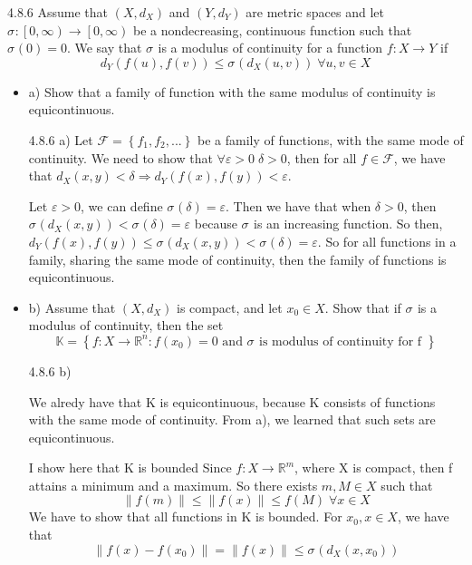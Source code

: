 \documentclass[a4paper,norsk]{article}
\renewcommand{\leq}{\leqslant}
\renewcommand{\epsilon}{\varepsilon}
\begin{document}
\begin{oppgavebox}{4.8.6}{}
Assume that $ \left( X, d_X \right)  $ and $ \left( Y, d_Y \right)  $ are metric spaces and let $ \sigma _{ } : \left[ 0, \infty \right) \to  \left[ 0, \infty \right)  $ be a nondecreasing, continuous function such that $ \sigma _{ } (0) = 0 $. We say that $ \sigma _{ }  $ is a modulus of continuity for a function $ f : X \to Y $ if
\[
    d_Y \left( f(u), f(v) \right) \leq \sigma _{ } \left( d_X \left( u, v \right)  \right) \; \forall  u, v \in X
\]
\begin{itemize}
  \item a) Show that a family of function with the same modulus of continuity is equicontinuous. 
  

  \begin{proofbox}{4.8.6 a)}{}
    Let $ \mathcal{F} = \left\{ f_1, f_2, ... \right\}  $ be a family of functions, with the same mode of continuity. We need to show that $ \forall \epsilon > 0 \; \delta > 0 $, then for all $ f \in \mathcal{F} $, we have that  $ d_X \left( x, y \right) < \delta  \Rightarrow d_Y \left( f(x), f(y) \right) < \epsilon  $. 

    Let $ \epsilon > 0 $, we can define $ \sigma _{ } ( \delta ) = \epsilon  $. Then we have that when $ \delta  > 0 $, then $ \sigma _{ } \left( d_X(x, y) \right) < \sigma _{ } \left( \delta  \right) = \epsilon    $ because $ \sigma _{ }  $ is an increasing function. So then,  $ d_Y \left( f(x), f(y) \right) \leq \sigma _{ } \left( d_X \left( x, y \right)  \right) < \sigma _{ } ( \delta ) = \epsilon    $. So for all functions in a family, sharing the same mode of continuity, then the family of functions is equicontinuous.
  \end{proofbox}


  \item b) Assume that $ \left( X, d_X \right)  $ is compact, and let $ x_0 \in X $. Show that if $ \sigma _{ }  $ is a modulus of continuity, then the set
  \[
      \mathbb{K} = \left\{ f : X \to \mathbb{R}^n : f(x_0) = 0 \text{ and  } \sigma _{ }  \text{ is modulus of continuity for f }  \right\} 
  \]

  \begin{proofbox}{4.8.6 b)}{}

    We alredy have that K is equicontinuous, because K consists of functions with the same mode of continuity. From a), we learned that such sets are equicontinuous.

    I show here that K is bounded
    Since $ f : X \to \mathbb{R}^m $, where X is compact, then f attains a minimum and a maximum. So there exists $ m, M \in X $ such that 
    \[
        \left\lVert f(m) \right\rVert \leq \left\lVert f(x) \right\rVert \leq f(M) \; \forall x \in X
    \]
    We have to show that all functions in K is bounded. For $ x_0, x \in X $, we have that 
    \[
        \left\lVert f(x) - f(x_0) \right\rVert = \left\lVert f(x) \right\rVert \leq \sigma _{ } \left( d_X \left( x, x_0 \right)  \right)  
    \]


\end{proofbox}
\end{itemize}
\end{oppgavebox}
\end{document}
